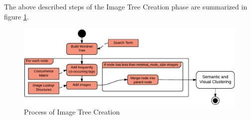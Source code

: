 The above described steps of the Image Tree Creation phase are summarized in figure \ref{fig_imagetreecreation}.

\begin{figure}[h]
\centering
\includegraphics[width=\textwidth]{images/image_tree_creation.pdf}
\caption{Process of Image Tree Creation}
\label{fig_imagetreecreation}
\end{figure}
